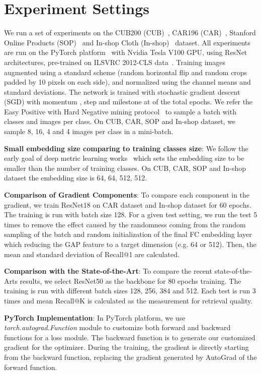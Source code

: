 \documentclass[10pt,twocolumn,letterpaper]{article}
\begin{document}
\section{Experiment Settings}
\label{sec:experiments}
We run a set of experiments on the CUB200 (CUB)~\cite{CUB200}, CAR196 (CAR)~\cite{CAR196}, Stanford Online Products (SOP)~\cite{SOP} and In-shop Cloth (In-shop)~\cite{ICR} dataset. All experiments are run on the PyTorch platform~\cite{pytorch} with Nvidia Tesla V100 GPU, using ResNet~\cite{resnet} architectures, pre-trained on ILSVRC 2012-CLS data~\cite{ILSVRC15}. Training images augmented using a standard scheme (random horizontal flip and random crops padded by 10 pixels on each side), and normalized using the channel means and standard deviations. The network is trained with stochastic gradient descent (SGD) with momentum , step  and milestone at  of the total epochs. We refer the Easy Positive with Hard Negative mining protocol~\cite{Xuan_2020_WACV} to sample a batch with  classes and  images per class. On CUB, CAR, SOP and In-shop dataset, we sample 8, 16, 4 and 4 images per class in a mini-batch. 

\textbf{Small embedding size comparing to training classes size}: We follow the early goal of deep metric learning works~\cite{SOP,Npairs,Proxy,harwood2017smart} which sets the embedding size to be smaller than the number of training classes. On CUB, CAR, SOP and In-shop dataset the embedding size is 64, 64, 512, 512.

\textbf{Comparison of Gradient Components}: To compare each component in the gradient, we train ResNet18 on CAR dataset and In-shop dataset for 60 epochs. The training is run with batch size 128. For a given test setting, we run the test 5 times to remove the effect caused by the randomness coming from the random sampling of the batch and random initialization of the final FC embedding layer which reducing the GAP feature to a target dimension (e.g. 64 or 512). Then, the mean and standard deviation of Recall@1 are calculated. 

\textbf{Comparison with the State-of-the-Art}: To compare the recent state-of-the-Arts results, we select ResNet50 as the backbone for 80 epochs training. The training is run with different batch sizes 128, 256, 384 and 512. Each test is run 3 times and mean Recall@K is calculated as the measurement for retrieval quality. 

\textbf{PyTorch Implementation}: In PyTorch platform, we use \textit{torch.autograd.Function} module to customize both forward and backward functions for a loss module. The backward function is to generate our customized gradient for the optimizer. During the training, the gradient is directly starting from the backward function, replacing the gradient generated by AutoGrad of the forward function. 
\end{document}

